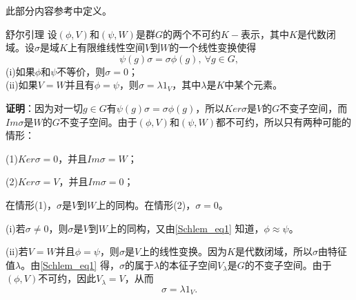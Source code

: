 



此部分内容参考\cite{维声表示}中定义。

\begin{lemma}{舒尔引理}
设$(\phi,V)$和$(\psi,W)$是群$G$的两个不可约$K-$表示，其中$K$是代数闭域。设$\sigma$是域$K$上有限维线性空间$V$到$W$的一个线性变换使得
\begin{equation}\label{Schlem_eq1}
\psi(g)\sigma =\sigma \phi(g),~\forall g \in G,
\end{equation}
(i)如果$\phi$和$\psi$不等价，则$\sigma=0$； \\
(ii)如果$V=W$并且有$\phi=\psi$，则$\sigma=\lambda1_V$，其中$\lambda$是$K$中某个元素。
\end{lemma}

\textbf{证明}：因为对一切$g\in G$有$\psi(g)\sigma =\sigma \phi(g)$，所以$Ker\sigma $是$V$的$G$不变子空间，而$Im\sigma$是$W$的$G$不变子空间。由于$(\phi,V)$和$(\psi,W)$都不可约，所以只有两种可能的情形：

(1)$Ker\sigma =0$，并且$Im\sigma=W$；

(2)$Ker\sigma =V$，并且$Im\sigma=0$；

在情形(1)，$\sigma $是$V$到$W$上的同构。在情形(2)，$\sigma=0$。

(i)若$\sigma \neq 0$，则$\sigma$是$V$到$W$上的同构，又由\autoref{Schlem_eq1} 知道，$\phi \approx \psi$。

(ii)若$V=W$并且$\phi=\psi$，则$\sigma$是$V$上的线性变换。因为$K$是代数闭域，所以$\sigma$由特征值$\lambda$。由\autoref{Schlem_eq1} 得，$\sigma$的属于$\lambda$的本征子空间$V_\lambda$是$G$的不变子空间。由于$(\phi,V)$不可约，因此$V_\lambda=V$，从而
\begin{equation}
\sigma=\lambda1_V.
\end{equation}


